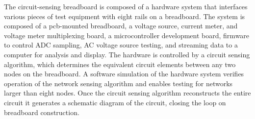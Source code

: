 \documentclass[11pt,twoside]{mitthesis}
\begin{document}
The circuit-sensing breadboard is composed of a hardware system that interfaces various pieces of test equipment with eight rails on a breadboard.
The system is composed of a pcb-mounted breadboard, a voltage source, current meter, and voltage meter multiplexing board, a microcontroller development board, firmware to control ADC sampling, AC voltage source testing, and streaming data to a computer for analysis and display.
The hardware is controlled by a circuit sensing algorithm, which determines the equivalent circuit elements between any two nodes on the breadboard.
A software simulation of the hardware system verifies operation of the network sensing algorithm and enables testing for networks larger than eight nodes.
Once the circuit sensing algorithm reconstructs the entire circuit it generates a schematic diagram of the circuit, closing the loop on breadboard construction.



\ifdefined\DEBUG
\end{document}
